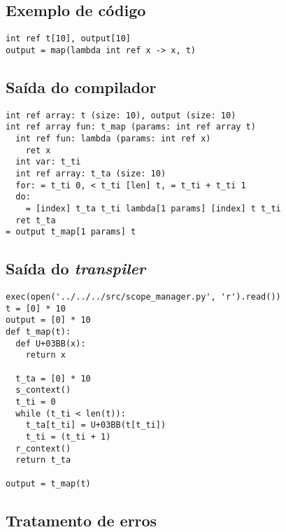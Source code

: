 \documentclass{article}
\begin{document}
\subsection{Exemplo de código}
\begin{verbatim}
int ref t[10], output[10]
output = map(lambda int ref x -> x, t)
\end{verbatim}

\subsection{Saída do compilador}

\begin{verbatim}
int ref array: t (size: 10), output (size: 10)
int ref array fun: t_map (params: int ref array t)
  int ref fun: lambda (params: int ref x)
    ret x
  int var: t_ti
  int ref array: t_ta (size: 10)
  for: = t_ti 0, < t_ti [len] t, = t_ti + t_ti 1
  do:
    = [index] t_ta t_ti lambda[1 params] [index] t t_ti
  ret t_ta
= output t_map[1 params] t
\end{verbatim}

\subsection{Saída do \emph{transpiler}}

\begin{verbatim}
exec(open('../../../src/scope_manager.py', 'r').read())
t = [0] * 10
output = [0] * 10
def t_map(t):
  def U+03BB(x):
    return x

  t_ta = [0] * 10
  s_context()
  t_ti = 0
  while (t_ti < len(t)):
    t_ta[t_ti] = U+03BB(t[t_ti])
    t_ti = (t_ti + 1)
  r_context()
  return t_ta

output = t_map(t)
\end{verbatim}

\subsection{Tratamento de erros}
\end{document}
